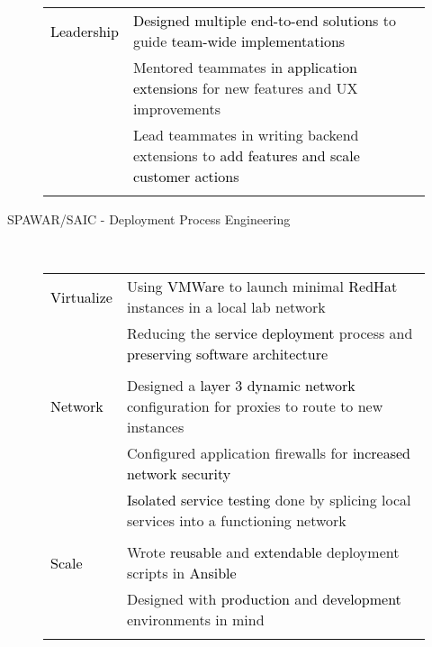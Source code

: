 \documentclass[12pt]{article}
\begin{document}
\begin{description}
\begin{description}
{\begin{tabular}{l|l}
                        \\[-1.7mm]
                        \textcolor{black}{Leadership}
                            & \textcolor{black}{Designed multiple end-to-end solutions} to guide \textcolor{black}{team-wide implementations}\\
                            & Mentored teammates in \textcolor{black}{application extensions} for new features and UX improvements\\
                            & Lead teammates in writing backend extensions to \textcolor{black}{add features and scale customer actions}\\
                        \\[-1.0mm]
                    \end{tabular}
                }

                \item[SPAWAR/SAIC - Deployment Process Engineering] \hfill \\
                \textcolor{gray}{
                    \begin{tabular}{l|l}
                        \\[-1.0mm]
                        \textcolor{black}{Virtualize}
                            & Using \textcolor{black}{VMWare} to launch minimal \textcolor{black}{RedHat} instances in a local lab network\\
                            & Reducing the \textcolor{black}{service deployment} process and \textcolor{black}{preserving software architecture}\\
                        \\[-1.7mm]
                        \textcolor{black}{Network}
                            & Designed a \textcolor{black}{layer 3 dynamic network} configuration for proxies to route to new instances\\
                            & Configured application firewalls for \textcolor{black}{increased network security}\\
                            & \textcolor{black}{Isolated service testing} done by splicing local services into a functioning network\\
                        \\[-1.7mm]
                        \textcolor{black}{Scale}
                            & Wrote \textcolor{black}{reusable} and \textcolor{black}{extendable} deployment scripts in \textcolor{black}{Ansible}\\
                            & Designed with \textcolor{black}{production} and \textcolor{black}{development} environments in mind\\
                        \\[-1.0mm]
                    \end{tabular}
                }


\end{description}
\end{description}
\end{document}
